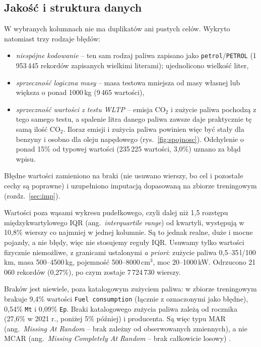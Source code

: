 \documentclass[10pt,twocolumn,a4paper]{article}
\newcommand{\lkm}{\,l/100\,km}
\begin{document}
\subsection{Jakość i struktura danych}
W wybranych kolumnach nie ma duplikatów ani pustych celów. Wykryto natomiast
trzy rodzaje błędów:
\begin{itemize}
\item \emph{niespójne kodowanie} -- ten sam rodzaj paliwa zapisano jako
\texttt{petrol}/\texttt{PETROL} (1\,953\,445 rekordów zapisanych wielkimi
literami); ujednolicono wielkość liter,
\item \emph{sprzeczność logiczna masy} -- masa testowa mniejsza od masy własnej
lub większa o ponad 1000\,kg (9\,465 wartości),
\item \emph{sprzeczność wartości z testu WLTP} -- emisja CO$_2$ i zużycie
paliwa pochodzą z tego samego testu, a spalenie litra danego paliwa zawsze
daje praktycznie tę samą ilość CO$_2$. Iloraz emisji i zużycia paliwa
powinien więc być stały dla benzyny i osobno dla oleju napędowego
(rys.~\ref{fig:spojnosc}). Odchylenie o ponad 15\% od typowej wartości
(235\,225 wartości, 3,0\%) uznano za błąd wpisu.
\end{itemize}
Błędne wartości zamieniono na braki (nie usuwano wierszy, bo cel i pozostałe
cechy są poprawne) i uzupełniono imputacją dopasowaną na zbiorze treningowym
(rozdz.~\ref{sec:imp}).

Wartości poza wąsami wykresu pudełkowego, czyli dalej niż 1,5 rozstępu
międzykwartylowego IQR (ang.\ \emph{interquartile range}) od kwartyli,
występują w 10,8\% wierszy co najmniej w jednej kolumnie. Są to jednak realne,
duże i mocne pojazdy, a nie błędy, więc nie stosujemy reguły IQR. Usuwamy tylko
wartości fizycznie niemożliwe, z granicami ustalonymi \emph{a priori}: zużycie
paliwa 0,5--35\lkm, masa 500--4500\,kg, pojemność 500--8000\,cm$^3$, moc
20--1000\,kW. Odrzucono 21\,060 rekordów (0,27\%), po czym zostaje
7\,724\,730 wierszy.

Braków jest niewiele, poza katalogowym zużyciem paliwa: w zbiorze treningowym
brakuje 9,4\% wartości \texttt{Fuel consumption} (łącznie z oznaczonymi jako
błędne), 0,54\% \texttt{Mt} i 0,09\% \texttt{Ep}. Braki katalogowego zużycia
paliwa zależą od rocznika (27,6\% w 2021 r., poniżej 5\% później)
i producenta. Są więc typu MAR (ang.\ \emph{Missing At Random} -- brak zależny
od obserwowanych zmiennych), a nie MCAR (ang.\ \emph{Missing Completely At
Random} -- brak całkowicie losowy) \cite{little2019missing}.
\end{document}
